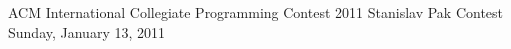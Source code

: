 \documentclass[11pt,a4paper,oneside]{article}
\begin{document}
\renewcommand{\t}[1]{\ifmmode{\mathtt{#1}}\else{\texttt{#1}}\fi}



\contest
{ACM International Collegiate Programming Contest 2011}%
{Stanislav Pak Contest}%
{Sunday, January 13, 2011}%

\newcommand{\inputproblem}[1]{}

\inputproblem{orange_cutting}
\end{document}

